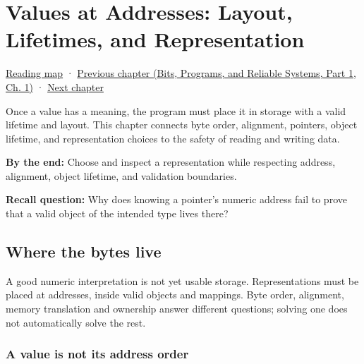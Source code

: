\chapter{Values at Addresses: Layout, Lifetimes, and Representation}\label{01-foundations-i-ch002-values-at-addresses-layout-lifetimes-and-representation}\hypertarget{01-foundations-i-ch002}{}\label{stagechapter:01-foundations-i-ch002}

\hypertarget{01-foundations-i-ch002-values-at-addresses-layout-lifetimes-and-representation}{}

\hyperref[volume-reading-map]{Reading map} · \href{../01-Bits-Programs-and-Reliable-Systems-P01/main.pdf\#nameddest=01-foundations-i-ch001-from-bits-to-running-systems}{Previous chapter (Bits, Programs, and Reliable Systems, Part 1, Ch. 1)} · \hyperref[01-foundations-i-ch003-records-as-resource-transactions]{Next chapter}

Once a value has a meaning, the program must place it in storage with a valid lifetime and layout. This chapter connects byte order, alignment, pointers, object lifetime, and representation choices to the safety of reading and writing data.

\textbf{By the end:} Choose and inspect a representation while respecting address, alignment, object lifetime, and validation boundaries.

\textbf{Recall question:} Why does knowing a pointer's numeric address fail to prove that a valid object of the intended type lives there?

\section{Where the bytes live}\label{01-foundations-i-ch002-where-the-bytes-live}

\hypertarget{01-foundations-i-ch002-where-the-bytes-live}{}

A good numeric interpretation is not yet usable storage. Representations must be placed at addresses, inside valid objects and mappings. Byte order, alignment, memory translation and ownership answer different questions; solving one does not automatically solve the rest.

\subsection{A value is not its address order}\label{01-foundations-i-ch002-a-value-is-not-its-address-order}

